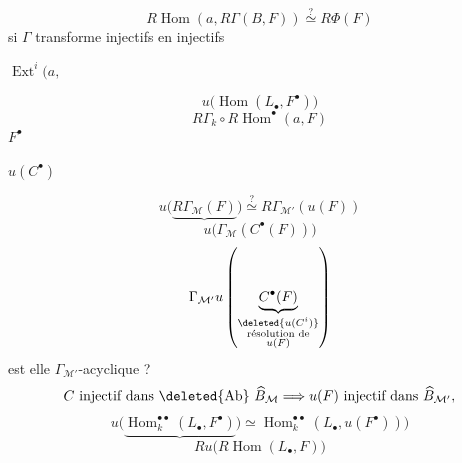\[
R\operatorname{Hom}(a,R\Gamma(B,F))\overset{?}{\simeq}R\Phi(F)
\]
si $\Gamma$ transforme injectifs en injectifs


$\operatorname{Ext}^i(a,$

\[
u\bigl(\operatorname{Hom}(L_\bullet,F^\bullet)\bigr)
\]
\[
R\Gamma_k\circ R\operatorname{Hom}^{\bullet}(a,F)
\]
$F^\bullet$

$u(C^\bullet)$

\[
u\bigl(\underbrace{R\Gamma_{\mathcal M}(F)}\bigr)\overset{?}{\simeq}R\Gamma_{\mathcal M'}(u(F))
\]
\[
u\bigl(\Gamma_{\mathcal M}(C^\bullet(F))\bigr)
\]
\[
\Gamma_{\mathcal M'}u\left(\underbrace{C^\bullet(F)}_{\substack{\deleted{u(C^i)}\\\text{résolution de}\\u(F)}}\right)
\]
est elle $\Gamma_{\mathcal M'}$-acyclique ?
\[
C\text{ injectif dans }\deleted{\mathrm{Ab}}\ \widehat B_{\mathcal M}
\Longrightarrow u(F)\text{ injectif dans }\widehat B_{\mathcal M'},
\]
\[
u\bigl(\underbrace{\operatorname{Hom}^{\bullet\bullet}_k(L_\bullet,F^\bullet)}\bigr)
\simeq\operatorname{Hom}^{\bullet\bullet}_k(L_\bullet,u(F^\bullet)))
\]
\[
Ru\bigl(R\operatorname{Hom}(L_\bullet,F)\bigr)
\]


